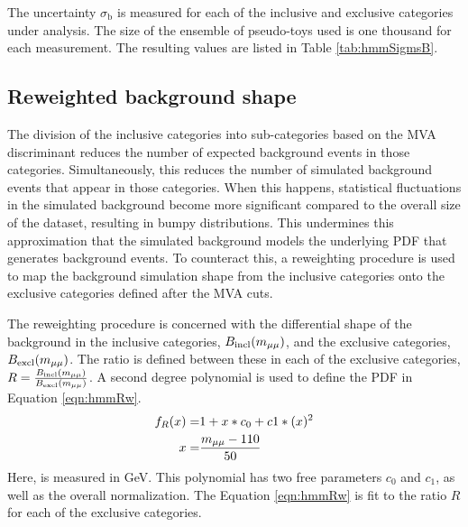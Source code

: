 The uncertainty $\sigma_\text{b}$ is measured for each of the inclusive and exclusive categories under analysis.
The size of the ensemble of pseudo-toys used is one thousand for each measurement.
The resulting values are listed in Table \ref{tab:hmmSigmsB}.


\subsection{Reweighted background shape}\label{sec:hmmRw}

The division of the inclusive categories into sub-categories based on the MVA discriminant reduces the number of expected background events in those categories.
Simultaneously, this reduces the number of simulated background events that appear in those categories.
When this happens, statistical fluctuations in the simulated background become more significant compared to the overall size of the dataset, resulting in bumpy \muu distributions.
This undermines this approximation that the simulated background models the underlying PDF that generates background events.
To counteract this, a reweighting procedure is used to map the background simulation shape from the inclusive categories onto the exclusive categories defined after the MVA cuts.

The reweighting procedure is concerned with the differential \muu shape of the background in the inclusive categories, $B_\text{incl}(m_{\mu\mu})$, and the exclusive categories, $B_\text{excl}(m_{\mu\mu})$.
The ratio is defined between these in each of the exclusive categories, $R=\frac{B_\text{incl}(m_{\mu\mu})}{B_\text{excl}(m_{\mu\mu})}$.
A second degree polynomial is used to define the PDF in Equation \ref{eqn:hmmRw}.
\begin{equation}\begin{split} \label{eqn:hmmRw}
f_R(x)=&1+x*c_0+c 1*(x)^2 \\
x=&\frac{m_{\mu\mu}-110}{50} \\
\end{split}\end{equation} 
Here, \muu is measured in GeV.
This polynomial has two free parameters $c_0$ and $c_1$, as well as the overall normalization.
The Equation \ref{eqn:hmmRw} is fit to the ratio $R$ for each of the exclusive categories.

